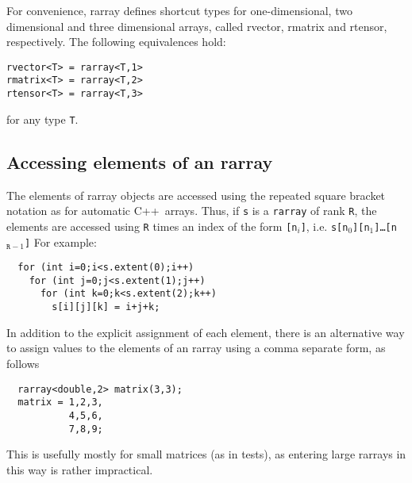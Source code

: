 \documentclass[11pt,twoside]{article}
\newcommand{\cxx}{C{++}}
\begin{document}
For convenience, rarray defines shortcut types for
one-dimensional, two dimensional and three dimensional arrays, called
rvector, rmatrix and rtensor, respectively. The following equivalences hold:

\begin{framed}\vspace{-18pt}%
\begin{verbatim}
rvector<T> = rarray<T,1>
rmatrix<T> = rarray<T,2>
rtensor<T> = rarray<T,3>
\end{verbatim}
\vspace{-18pt}\end{framed}\noindent
for any type \texttt{T}.

\subsection{Accessing elements of an rarray}

The elements of rarray objects are accessed using the repeated square
bracket notation as for automatic \cxx\ arrays. Thus, if \texttt{s} is a \texttt{rarray} of rank \texttt R, the elements are accessed using \texttt{R} times an index of the form \texttt{[n$_i$]}, i.e. \texttt{s[n$_0$][n$_1$]\dots[n$_{\texttt{R}-1}$]}
For example:\vspace{-9pt}
\begin{framed}\vspace{-18pt}%
\begin{verbatim}
  for (int i=0;i<s.extent(0);i++)
    for (int j=0;j<s.extent(1);j++)
      for (int k=0;k<s.extent(2);k++)
        s[i][j][k] = i+j+k;
\end{verbatim}%
\vspace{-12pt}
\end{framed}%

In addition to the explicit assignment of each element, there is an
alternative way to assign values to the elements of an rarray using a
comma separate form, as follows
\vspace{-9pt}
\begin{framed}\vspace{-18pt}%
\begin{verbatim}
  rarray<double,2> matrix(3,3);
  matrix = 1,2,3,
           4,5,6,
           7,8,9;
\end{verbatim}%
\vspace{-12pt}
\end{framed}\vspace{-8pt}\noindent
This is usefully mostly for small matrices (as in tests), as entering
large rarrays in this way is rather impractical.
\end{document}
